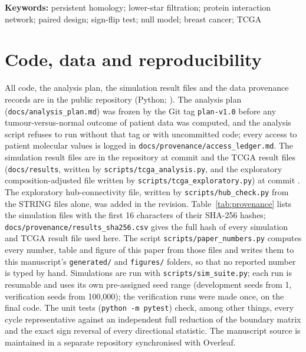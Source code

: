 \documentclass[11pt,a4paper]{article}
\begin{document}
\noindent\textbf{Keywords:} persistent homology; lower-star filtration; protein interaction network; paired design; sign-flip test; null model; breast cancer; TCGA







\section*{Code, data and reproducibility}
All code, the analysis plan, the simulation result files and the data provenance records are in the public repository \coderepo{} (Python; ). The analysis plan (\texttt{docs/analysis\_plan.md}) was frozen by the Git tag \texttt{plan-v1.0} before any tumour-versus-normal outcome of patient data was computed, and the analysis script refuses to run without that tag or with uncommitted code; every access to patient molecular values is logged in \texttt{docs/provenance/access\_ledger.md}. The simulation result files are in the repository at commit \resultscommit{} and the TCGA result files (\texttt{docs/results}, written by \texttt{scripts/tcga\_analysis.py}, and the exploratory composition-adjusted file written by \texttt{scripts/tcga\_exploratory.py}) at commit \tcgacommit{}. The exploratory hub-connectivity file, written by \texttt{scripts/hub\_check.py} from the STRING files alone, was added in the revision. Table~\ref{tab:provenance} lists the simulation files with the first 16 characters of their SHA-256 hashes; \texttt{docs/provenance/results\_sha256.csv} gives the full hash of every simulation and TCGA result file used here. The script \texttt{scripts/paper\_numbers.py} computes every number, table and figure of this paper from those files and writes them to this manuscript's \texttt{generated/} and \texttt{figures/} folders, so that no reported number is typed by hand. Simulations are run with \texttt{scripts/sim\_suite.py}; each run is resumable and uses its own pre-assigned seed range (development seeds from 1, verification seeds from 100{,}000); the verification runs were made once, on the final code. The unit tests (\texttt{python -m pytest}) check, among other things, every cycle representative against an independent full reduction of the boundary matrix and the exact sign reversal of every directional statistic. The manuscript source is maintained in a separate repository synchronised with Overleaf. 
\end{document}

